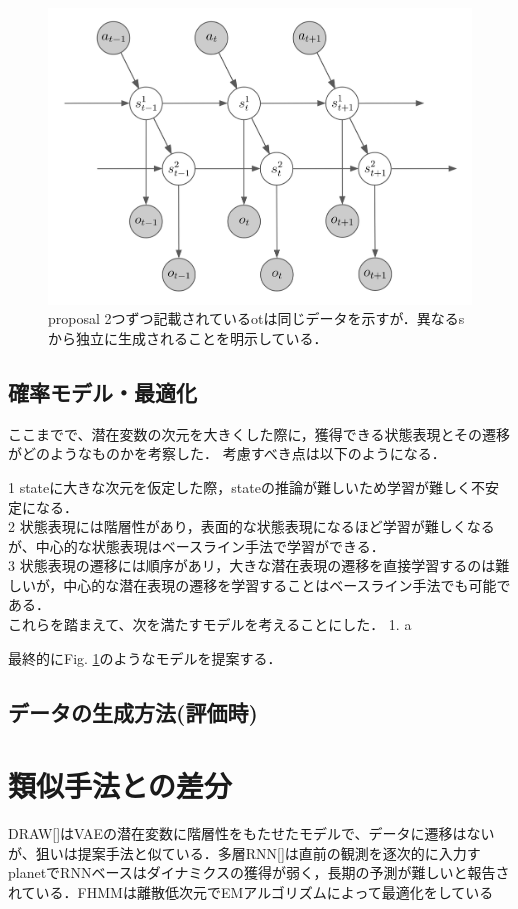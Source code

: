 \begin{figure}[tbp]
  \begin{center}
    \includegraphics[width=0.8\linewidth]{./figures/proposal.png}
    \caption{proposal 2つずつ記載されているotは同じデータを示すが．異なるsから独立に生成されることを明示している．}
    \label{fig:proposal}
  \end{center}
\end{figure}


\subsection{確率モデル・最適化}

ここまでで、潜在変数の次元を大きくした際に，獲得できる状態表現とその遷移がどのようなものかを考察した．
考慮すべき点は以下のようになる．

1 stateに大きな次元を仮定した際，stateの推論が難しいため学習が難しく不安定になる． \\
2 状態表現には階層性があり，表面的な状態表現になるほど学習が難しくなるが、中心的な状態表現はベースライン手法で学習ができる． \\
3 状態表現の遷移には順序があリ，大きな潜在表現の遷移を直接学習するのは難しいが，中心的な潜在表現の遷移を学習することはベースライン手法でも可能である． \\

これらを踏まえて、次を満たすモデルを考えることにした．
1. a


最終的にFig. \ref{fig:proposal}のようなモデルを提案する．





\subsection{データの生成方法(評価時)}
\section{類似手法との差分}
DRAW[]はVAEの潜在変数に階層性をもたせたモデルで、データに遷移はないが、狙いは提案手法と似ている．多層RNN[]は直前の観測を逐次的に入力すplanetでRNNベースはダイナミクスの獲得が弱く，長期の予測が難しいと報告されている．FHMMは離散低次元でEMアルゴリズムによって最適化をしている


